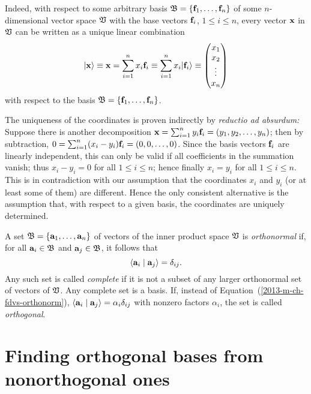 Indeed, with respect to some arbitrary  basis ${\frak B}=\{
{\bf f}_1, \ldots , {\bf f}_n\}$ of some $n$-dimensional vector space ${\frak V}$
with the base vectors ${\bf f}_i$, $1\le i\le n$, every vector ${\bf x}$ in  ${\frak V}$
can be written as a unique linear combination
\begin{equation}
 \vert {\bf x} \rangle \equiv {\bf x} = \sum_{i=1}^n x_i{\bf f}_i
\equiv
\sum_{i=1}^n x_i \vert {\bf f}_i \rangle
\equiv \begin{pmatrix} x_1\\x_2\\ \vdots \\ x_n \end{pmatrix}
\end{equation}
with respect to the basis  ${\frak B}=\{
{\bf f}_1, \ldots , {\bf f}_n\}$.

{\color{OliveGreen}
\bproof
The uniqueness of the coordinates is proven indirectly by {\em reductio ad absurdum:}
Suppose there is another decomposition
${\bf x} = \sum_{i=1}^n y_i{\bf f}_i = (y_1,y_2, \ldots , y_n) $;
then by subtraction, $0 = \sum_{i=1}^n (x_i-y_i) {\bf f}_i = (0,0, \ldots , 0)$.
Since the basis vectors ${\bf f}_i$ are linearly independent,
this can only be valid if all coefficients in the summation  vanish;
thus $x_i-y_i=0$ for all $1\le i\le n$; hence finally  $x_i=y_i$ for all $1\le i\le n$.
This is in contradiction with our assumption that the coordinates $x_i$ and $y_i$
(or at least some of them) are different.
Hence the only consistent alternative is the assumption that, with respect to a given basis, the coordinates are uniquely determined.
\eproof
}

A  set    ${\frak B} = \{ {\bf a}_1, \ldots , {\bf a}_n\}$
of  vectors   of the inner product space $\frak V$
is {\em orthonormal}
if, for all
 ${\bf a}_i\in\frak B$ and
 ${\bf a}_j\in\frak B$,
it follows that
\begin{equation}
\langle {\bf a}_i \mid {\bf a}_j \rangle =\delta_{ij}.
\label{2013-m-ch-fdvs-orthonorm}
\end{equation}
Any such set is called {\em complete}
if it is not a subset of any larger orthonormal set of vectors of $\frak V$.
Any complete set is a basis.
If, instead of Equation~(\ref{2013-m-ch-fdvs-orthonorm}),
$\langle {\bf a}_i \mid {\bf a}_j \rangle = \alpha_i \delta_{ij}$
with nonzero factors $\alpha_i$, the set is called {\em orthogonal}.


\section{Finding orthogonal bases from nonorthogonal ones}
\label{2019-mm-ch-fdvs-GS}

